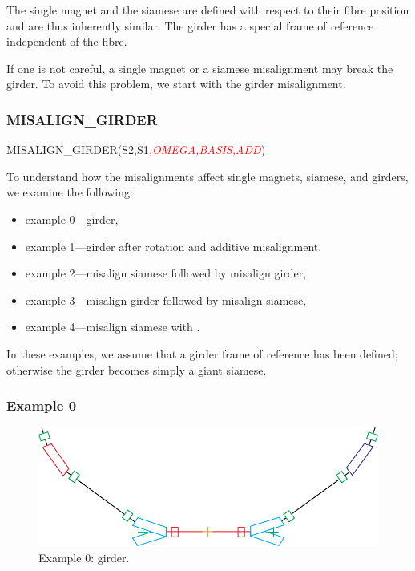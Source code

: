 The single magnet and the siamese are defined with respect to their
fibre position and are thus inherently similar. The girder has a special
frame of reference independent of the fibre.

If one is not careful, a single magnet or a siamese misalignment may
break the girder. To avoid this problem, we start with the girder misalignment.


\subsubsection{MISALIGN\_GIRDER}

%
\begin{ptccode}
MISALIGN_GIRDER(S2,S1\textit{\textcolor{red}{,OMEGA,BASIS,ADD}})
\end{ptccode}

To understand how the misalignments affect single magnets, siamese, 
and girders, we examine the following:
\begin{itemize}
  \item example 0---girder,
  \item example 1---girder after rotation and additive misalignment,
  \item example 2---misalign siamese followed by misalign girder,
  \item example 3---misalign girder followed by misalign siamese,
  \item example 4---misalign siamese with .
\end{itemize}

In these examples, we assume that a girder frame of reference has been defined;
otherwise the girder becomes simply a giant siamese.


\subsubsection*{Example 0}

\begin{figure}[ht]
  \centering
  \includegraphics[width=.9\textwidth]{illustrations/misalign-fig1}
  \caption{Example 0: girder.}
  \label{fig:Example-0}
\end{figure}

